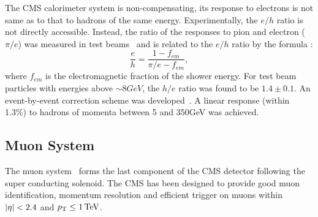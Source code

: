 The CMS calorimeter system is non-compensating, \ie its response to electrons is not same as to that to hadrons of the same energy.
Experimentally, the $e/h$ ratio is not directly accessible. Instead, the ratio of the responses to pion and electron ($\pi/e$) was measured in 
test beams~\cite{Abdullin:2009zz} and is related to the $e/h$ ratio by the formula :
\begin{equation}
\frac{e}{h} =\frac{1-f_{em}}{\pi/e - f_{em}},
\end{equation}
where $f_{em}$ is the electromagnetic fraction of the shower energy. For test beam particles with energies above $\sim8\unit{GeV}$, the $h/e$ ratio
was found to be $1.4\pm0.1$. An event-by-event correction scheme was developed~\cite{Abdullin:2009zz,Wigmans:2010zz}. A linear response 
(within 1.3\%) to hadrons of momenta between 5 and 350\unit{GeV} was achieved. 


\subsection{Muon System}\label{sec:muon}
The muon system~\cite{muonTDR} forms the last component of the CMS detector following the super conducting solenoid. 
The CMS has been designed to provide good muon identification, momentum resolution and efficient trigger on muons within $\lvert \eta \rvert<2.4$ and $p_{\mathrm T}\le1\mathrm{\,TeV}$.

